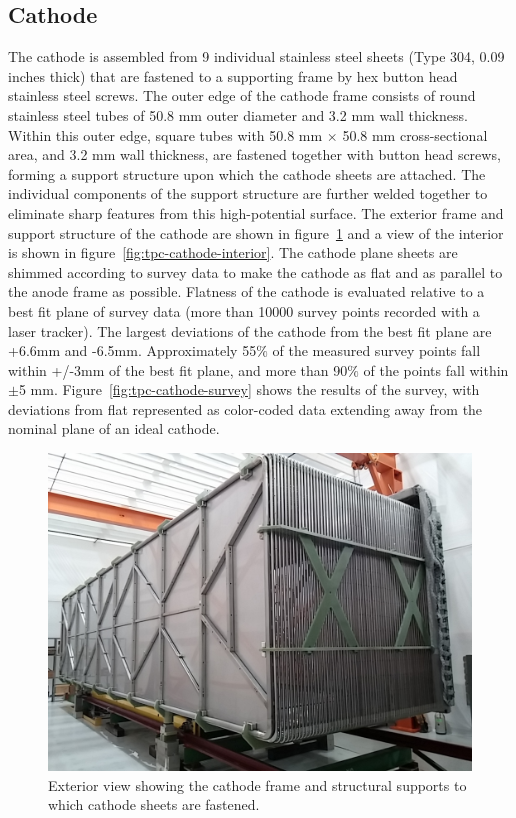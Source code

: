 \subsection{Cathode}
The cathode is assembled from 9 individual stainless steel sheets (Type 304, 0.09 inches thick) that are fastened to a supporting frame by hex button head stainless steel screws. The outer edge of the cathode frame consists of round stainless steel tubes of 50.8 mm outer diameter and 3.2 mm wall thickness.  Within this outer edge, square tubes with 50.8 mm $\times$ 50.8 mm cross-sectional area, and 3.2 mm wall thickness, are fastened together with button head screws, forming a support structure upon which the cathode sheets are attached.  The individual components of the support structure are further welded together to eliminate sharp features from this high-potential surface.  The exterior frame and support structure of the cathode are shown in figure~\ref{fig:tpc-cathode} and a view of the interior is shown in figure~\ref{fig:tpc-cathode-interior}. The cathode plane sheets are shimmed according to survey data to make the cathode as flat and as parallel to the anode frame as possible. Flatness of the cathode is evaluated relative to a best fit plane of survey data (more than 10000 survey points recorded with a laser tracker). The largest deviations of the cathode from the best fit plane are +6.6mm and -6.5mm. Approximately 55$\%$ of the measured survey points fall within +/-3mm of the best fit plane, and more than 90$\%$ of the points fall within $\pm$5 mm.  Figure~\ref{fig:tpc-cathode-survey} shows the results of the survey, with deviations from flat represented as color-coded data extending away from the nominal plane of an ideal cathode. %

\begin{figure}[htb]
\centering	
\includegraphics[width=0.55\linewidth]{figures/tpc-completed-upstream-left.jpg}
\caption{Exterior view showing the cathode frame and structural supports to which cathode sheets are fastened.}
\label{fig:tpc-cathode}
\end{figure}

